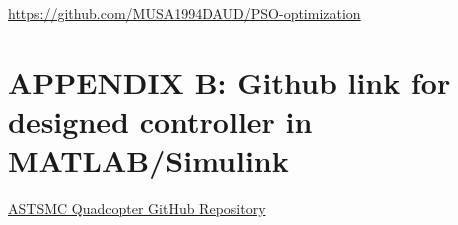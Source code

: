 \documentclass[12pt,a4paper]{report}
\begin{document}
\begin{center}
\setcounter{equation}{0}
\url{https://github.com/MUSA1994DAUD/PSO-optimization}

\vspace{1cm}

\section{APPENDIX B: Github link for designed controller in MATLAB/Simulink}

\setcounter{equation}{0}


\href{https://github.com/MUSA1994DAUD/Adaptive-super-twisting-sliding-mode-controller-for-quadcopter}{ASTSMC Quadcopter GitHub Repository}


\\\\
 

\end{center}
\end{document}
